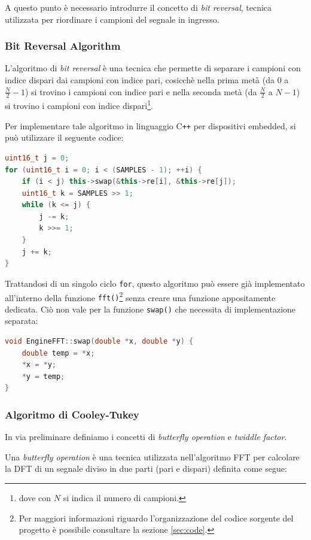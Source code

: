 \documentclass[a4paper,12pt]{report}  %
\newcommand{\lstinlinebg}[1]{\colorbox{backcolour}{\lstinline|#1|}}
\begin{document}
A questo punto è necessario introdurre il concetto di \textit{bit reversal}, tecnica utilizzata per riordinare i campioni del segnale in ingresso.

\subsubsection{Bit Reversal Algorithm}
L'algoritmo di \textit{bit reversal} è una tecnica che permette di separare i campioni con indice dispari dai campioni con indice pari, cosicchè nella prima metà (da $0$ a $\frac{N}{2} - 1$) si trovino i campioni con indice pari e nella seconda metà (da $\frac{N}{2}$ a $N - 1$) si trovino i campioni con indice dispari\footnote{dove con $N$ si indica il numero di campioni.}.

Per implementare tale algoritmo in linguaggio C\texttt{++} per dispositivi embedded, si può utilizzare il seguente codice:
\begin{lstlisting}[language=C++, keywords={void, uint16_t, while, for, if, this}]
uint16_t j = 0;
for (uint16_t i = 0; i < (SAMPLES - 1); ++i) {
    if (i < j) this->swap(&this->re[i], &this->re[j]);
    uint16_t k = SAMPLES >> 1;
    while (k <= j) {
        j -= k;
        k >>= 1;
    }
    j += k;
}
\end{lstlisting}
Trattandosi di un singolo ciclo \lstinlinebg{for}, questo algoritmo può essere già implementato all'interno della funzione \lstinlinebg{fft()}\footnote{Per maggiori informazioni riguardo l'organizzazione del codice sorgente del progetto è possibile consultare la sezione \ref{sec:code}.} senza creare una funzione appositamente dedicata.
Ciò non vale per la funzione \lstinlinebg{swap()} che necessita di implementazione separata:
\begin{lstlisting}[language=C++, keywords={void, double}]
void EngineFFT::swap(double *x, double *y) {
    double temp = *x;
    *x = *y;
    *y = temp;
}
\end{lstlisting}

\subsubsection{Algoritmo di Cooley-Tukey}
In via preliminare definiamo i concetti di \textit{butterfly operation} e \textit{twiddle factor}.

Una \textit{butterfly operation} è una tecnica utilizzata nell'algoritmo FFT per calcolare la DFT di un segnale diviso in due parti (pari e dispari) definita come segue:
\end{document}
